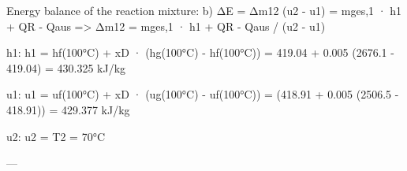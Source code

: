 Energy balance of the reaction mixture:  
b) ΔE = Δm12 (u2 - u1) = mges,1 · h1 + QR - Qaus  
=> Δm12 = mges,1 · h1 + QR - Qaus / (u2 - u1)  

h1:  
h1 = hf(100°C) + xD · (hg(100°C) - hf(100°C))  
= 419.04 + 0.005 (2676.1 - 419.04) = 430.325 kJ/kg  

u1:  
u1 = uf(100°C) + xD · (ug(100°C) - uf(100°C))  
= (418.91 + 0.005 (2506.5 - 418.91)) = 429.377 kJ/kg  

u2:  
u2 = T2 = 70°C  

---